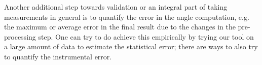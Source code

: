 Another additional step towards validation or an integral part of taking measurements in general %
is to quantify the error in the angle computation, e.g. the maximum or average error in the final result due to the changes in the pre-processing step. %
One can try to do achieve this empirically by trying our tool on a large amount of data to estimate the statistical error; there are ways to also try to quantify the instrumental error. 


%


